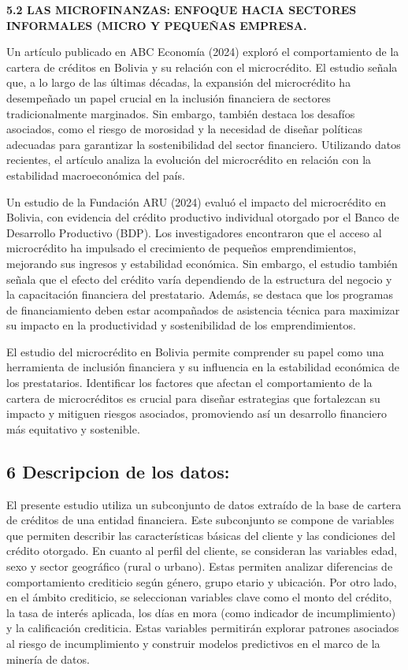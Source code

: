 \documentclass[Royal,times,sageh]{sagej}
\begin{document}
\textbf{5.2 LAS MICROFINANZAS: ENFOQUE HACIA SECTORES INFORMALES (MICRO
Y PEQUEÑAS EMPRESA.}

Un artículo publicado en ABC Economía (2024) exploró el comportamiento
de la cartera de créditos en Bolivia y su relación con el microcrédito.
El estudio señala que, a lo largo de las últimas décadas, la expansión
del microcrédito ha desempeñado un papel crucial en la inclusión
financiera de sectores tradicionalmente marginados. Sin embargo, también
destaca los desafíos asociados, como el riesgo de morosidad y la
necesidad de diseñar políticas adecuadas para garantizar la
sostenibilidad del sector financiero. Utilizando datos recientes, el
artículo analiza la evolución del microcrédito en relación con la
estabilidad macroeconómica del país.

Un estudio de la Fundación ARU (2024) evaluó el impacto del microcrédito
en Bolivia, con evidencia del crédito productivo individual otorgado por
el Banco de Desarrollo Productivo (BDP). Los investigadores encontraron
que el acceso al microcrédito ha impulsado el crecimiento de pequeños
emprendimientos, mejorando sus ingresos y estabilidad económica. Sin
embargo, el estudio también señala que el efecto del crédito varía
dependiendo de la estructura del negocio y la capacitación financiera
del prestatario. Además, se destaca que los programas de financiamiento
deben estar acompañados de asistencia técnica para maximizar su impacto
en la productividad y sostenibilidad de los emprendimientos.

El estudio del microcrédito en Bolivia permite comprender su papel como
una herramienta de inclusión financiera y su influencia en la
estabilidad económica de los prestatarios. Identificar los factores que
afectan el comportamiento de la cartera de microcréditos es crucial para
diseñar estrategias que fortalezcan su impacto y mitiguen riesgos
asociados, promoviendo así un desarrollo financiero más equitativo y
sostenible.

\subsection{\texorpdfstring{6 \textbf{Descripcion de los
datos:}}{6 Descripcion de los datos:}}\label{descripcion-de-los-datos}

El presente estudio utiliza un subconjunto de datos extraído de la base
de cartera de créditos de una entidad financiera. Este subconjunto se
compone de variables que permiten describir las características básicas
del cliente y las condiciones del crédito otorgado. En cuanto al perfil
del cliente, se consideran las variables edad, sexo y sector geográfico
(rural o urbano). Estas permiten analizar diferencias de comportamiento
crediticio según género, grupo etario y ubicación. Por otro lado, en el
ámbito crediticio, se seleccionan variables clave como el monto del
crédito, la tasa de interés aplicada, los días en mora (como indicador
de incumplimiento) y la calificación crediticia. Estas variables
permitirán explorar patrones asociados al riesgo de incumplimiento y
construir modelos predictivos en el marco de la minería de datos.
\end{document}
